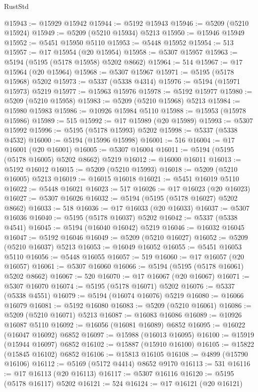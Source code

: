 \begin{lexlean}{RustStd}
\begin{coremodule}
@15943 := @15929 @15942
@15944 := @5192 @15943
@15946 := @5209 (@5210 @15924)
@15949 := @5209 (@5210 @15934) @5213
@15950 := @15946 @15949
@15952 := @5451 @15950 @5110
@15953 := @5448 @15952
@15954 := 513
@15957 := @17 @15954 (@20 @15954)
@15958 := @5307 @15957
@15963 := @5194 (@5195 (@5178 @15958) @5202 @8662)
@15964 := 514
@15967 := @17 @15964 (@20 @15964)
@15968 := @5307 @15967
@15971 := @5195 (@5178 @15968) @5202
@15973 := @5337 (@5338 @4314)
@15976 := @5194 (@15971 @15973) @5219
@15977 := @15963 @15976
@15978 := @5192 @15977
@15980 := @5209 (@5210 @15958)
@15983 := @5209 (@5210 @15968) @5213
@15984 := @15980 @15983
@15986 := @10926 @15984 @5110
@15988 := @15953 (@15978 @15986)
@15989 := 515
@15992 := @17 @15989 (@20 @15989)
@15993 := @5307 @15992
@15996 := @5195 (@5178 @15993) @5202
@15998 := @5337 (@5338 @4532)
@16000 := @5194 (@15996 @15998)
@16001 := 516
@16004 := @17 @16001 (@20 @16001)
@16005 := @5307 @16004
@16011 := @5194 (@5195 (@5178 @16005) @5202 @8662) @5219
@16012 := @16000 @16011
@16013 := @5192 @16012
@16015 := @5209 (@5210 @15993)
@16018 := @5209 (@5210 @16005) @5213
@16019 := @16015 @16018
@16021 := @5451 @16019 @5110
@16022 := @5448 @16021
@16023 := 517
@16026 := @17 @16023 (@20 @16023)
@16027 := @5307 @16026
@16032 := @5194 (@5195 (@5178 @16027) @5202 @8662)
@16033 := 518
@16036 := @17 @16033 (@20 @16033)
@16037 := @5307 @16036
@16040 := @5195 (@5178 @16037) @5202
@16042 := @5337 (@5338 @4541)
@16045 := @5194 (@16040 @16042) @5219
@16046 := @16032 @16045
@16047 := @5192 @16046
@16049 := @5209 (@5210 @16027)
@16052 := @5209 (@5210 @16037) @5213
@16053 := @16049 @16052
@16055 := @5451 @16053 @5110
@16056 := @5448 @16055
@16057 := 519
@16060 := @17 @16057 (@20 @16057)
@16061 := @5307 @16060
@16066 := @5194 (@5195 (@5178 @16061) @5202 @8662)
@16067 := 520
@16070 := @17 @16067 (@20 @16067)
@16071 := @5307 @16070
@16074 := @5195 (@5178 @16071) @5202
@16076 := @5337 (@5338 @4551)
@16079 := @5194 (@16074 @16076) @5219
@16080 := @16066 @16079
@16081 := @5192 @16080
@16083 := @5209 (@5210 @16061)
@16086 := @5209 (@5210 @16071) @5213
@16087 := @16083 @16086
@16089 := @10926 @16087 @5110
@16092 := @16056 (@16081 @16089) @6852
@16095 := @16022 (@16047 @16092) @6852
@16097 := @15988 (@16013 @16095)
@16100 := @15919 (@15944 @16097) @6852
@16102 := @15887 (@15910 @16100)
@16105 := @15822 (@15845 @16102) @6852
@16106 := @15813 @16105
@16108 := @4899 (@15790 @16106)
@16112 := @5169 (@5172 @4414) @8652 @9170
@16113 := 531
@16116 := @17 @16113 (@20 @16113)
@16117 := @5307 @16116
@16120 := @5195 (@5178 @16117) @5202
@16121 := 524
@16124 := @17 @16121 (@20 @16121)

\end{coremodule}
\end{lexlean}

